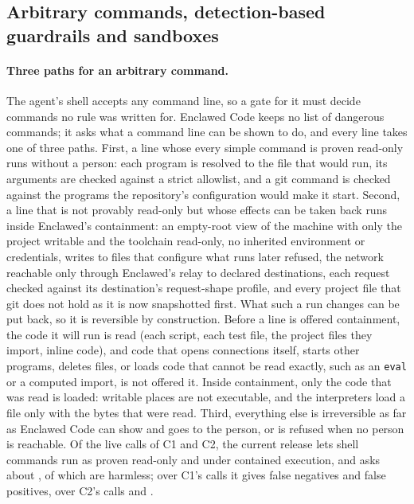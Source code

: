 \documentclass[11pt]{article}
\newcommand{\sys}{Enclawed}
\newcommand{\cz}{Enclawed Code}
\begin{document}
\subsection{Arbitrary commands, detection-based guardrails and sandboxes}
\label{sec:arbitrary}

\paragraph{Three paths for an arbitrary command.} The agent's shell
accepts any command line, so a gate for it must decide commands no rule
was written for. \cz{} keeps no list of dangerous commands; it asks what
a command line can be shown to do, and every line takes one of three
paths. First, a line whose every simple command is proven read-only runs
without a person: each program is resolved to the file that would run,
its arguments are checked against a strict allowlist, and a git command
is checked against the programs the repository's configuration would
make it start. Second, a line that is not provably read-only but whose
effects can be taken back runs inside \sys{}'s containment: an
empty-root view of the machine with only the project writable and the
toolchain read-only, no inherited environment or credentials, writes to
files that configure what runs later refused, the network reachable only
through \sys{}'s relay to declared destinations, each request checked
against its destination's request-shape profile, and every project file
that git does not hold as it is now snapshotted first. What such a run
changes can be put back, so it is reversible by construction. Before a
line is offered containment, the code it will run is read (each script,
each test file, the project files they import, inline code), and code
that opens connections itself, starts other programs, deletes files, or
loads code that cannot be read exactly, such as an \texttt{eval} or a
computed import, is not offered it.
Inside containment, only the code that was read is loaded: writable
places are not executable, and the interpreters load a file only with
the bytes that were read. Third,
everything else is irreversible as far as \cz{} can show and goes to the
person, or is refused when no person is reachable. Of the \CzDecided{}
live calls of C1 and C2, the current release lets
\CzAllowReadOnlyCommand{} shell commands run as proven read-only and
\CzAllowContained{} under contained execution, and asks about
\CzAsked{}, of which \CzAskedHarmless{} are harmless; over C1's
\CzOneCalls{} calls it gives \CzOneFN{} false negatives and \CzOneFP{}
false positives, over C2's \CzTwoCalls{} calls \CzTwoFN{} and \CzTwoFP{}.
\end{document}

